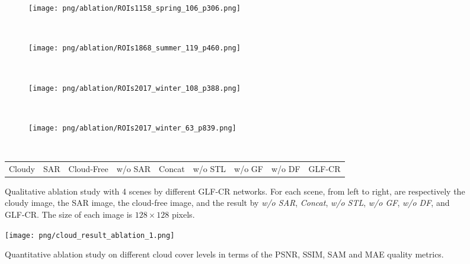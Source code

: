 \documentclass[a4paper,fleqn]{cas-dc}
\begin{document}
 
\def\sswidth{0.98\textwidth}
\begin{figure*}[!h]
    \centering
    \begin{subfigure}[b]{\sswidth}
     \centering
     \texttt{[image: png/ablation/ROIs1158\_spring\_106\_p306.png]}
    \end{subfigure}
    \\
    \begin{subfigure}[b]{\sswidth}
     \centering
     \texttt{[image: png/ablation/ROIs1868\_summer\_119\_p460.png]}
    \end{subfigure}
    \\
    \begin{subfigure}[b]{\sswidth}
     \centering
     \texttt{[image: png/ablation/ROIs2017\_winter\_108\_p388.png]}
    \end{subfigure}
    \\
    \begin{subfigure}[b]{\sswidth}
     \centering
     \texttt{[image: png/ablation/ROIs2017\_winter\_63\_p839.png]}
    \end{subfigure}
    \\
    \begin{minipage}{\sswidth}
    \begin{tabu} to \textwidth {X[c] X[c] X[c] X[c] X[c] X[c] X[c] X[c] X[c]}
    Cloudy & SAR & Cloud-Free & w/o SAR & Concat & w/o STL & w/o GF & w/o DF & GLF-CR
    \end{tabu}
    \end{minipage}
    \caption{Qualitative ablation study with 4 scenes by different GLF-CR networks. For each scene, from left to right, are respectively the cloudy image, the SAR image, the cloud-free image, and the result by {\it w/o SAR}, {\it Concat}, {\it w/o STL}, {\it w/o GF}, {\it w/o DF}, and GLF-CR. The size of each image is $128 \times 128$ pixels.}
    \label{ablation-study-figure}
    \vspace{-5mm}
\end{figure*}

\begin{figure*}[!t]
     \centering
     \texttt{[image: png/cloud\_result\_ablation\_1.png]}
     \vspace{-3mm}
     \caption{Quantitative ablation study on different cloud cover levels in terms of the PSNR, SSIM, SAM and MAE quality metrics.}
     \label{fig:ablation_cloud}
     \vspace{-5mm}
\end{figure*}
 
\end{document}

